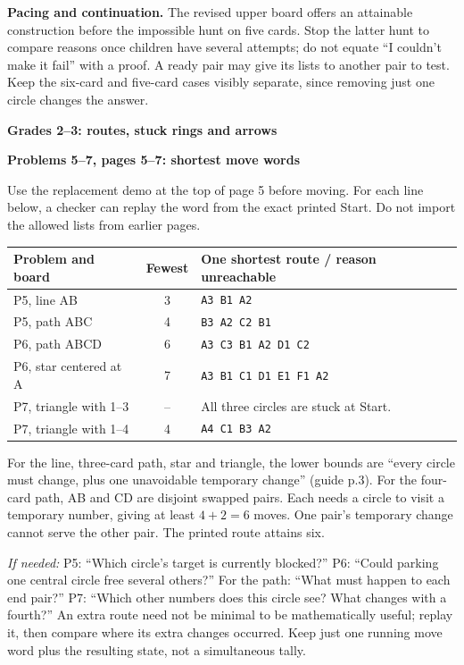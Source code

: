 \documentclass[10pt]{article}
\newcommand{\head}[1]{\par{\large\bfseries #1}\par}
\newcommand{\sub}[1]{\par\textbf{#1}\par}
\newcommand{\hint}[1]{\textit{If needed:} #1}
\newcommand{\word}[1]{\texttt{#1}}
\begin{document}
\textbf{Pacing and continuation.} The revised upper board offers an attainable construction before the impossible hunt on five cards. Stop the latter hunt to compare reasons once children have several attempts; do not equate ``I couldn't make it fail'' with a proof. A ready pair may give its lists to another pair to test. Keep the six-card and five-card cases visibly separate, since removing just one circle changes the answer.
\newpage
\head{Grades 2--3: routes, stuck rings and arrows}
\sub{Problems 5--7, pages 5--7: shortest move words}
Use the replacement demo at the top of page 5 before moving. For each line below, a checker can replay the word from the exact printed Start. Do not import the allowed lists from earlier pages.
\begin{center}\renewcommand{\arraystretch}{1.25}
\begin{tabular}{p{.30\linewidth}c p{.53\linewidth}}
Problem and board & Fewest & One shortest route / reason unreachable\\\midrule
P5, line AB & 3 & \word{A3 B1 A2}\\
P5, path ABC & 4 & \word{B3 A2 C2 B1}\\
P6, path ABCD & 6 & \word{A3 C3 B1 A2 D1 C2}\\
P6, star centered at A & 7 & \word{A3 B1 C1 D1 E1 F1 A2}\\
P7, triangle with 1--3 & -- & All three circles are stuck at Start.\\
P7, triangle with 1--4 & 4 & \word{A4 C1 B3 A2}\\
\end{tabular}\end{center}
For the line, three-card path, star and triangle, the lower bounds are ``every circle must change, plus one unavoidable temporary change'' (guide p.3). For the four-card path, AB and CD are disjoint swapped pairs. Each needs a circle to visit a temporary number, giving at least $4+2=6$ moves. One pair's temporary change cannot serve the other pair. The printed route attains six.

\hint{P5: ``Which circle's target is currently blocked?'' P6: ``Could parking one central circle free several others?'' For the path: ``What must happen to each end pair?'' P7: ``Which other numbers does this circle see? What changes with a fourth?''} An extra route need not be minimal to be mathematically useful; replay it, then compare where its extra changes occurred. Keep just one running move word plus the resulting state, not a simultaneous tally.
\end{document}
